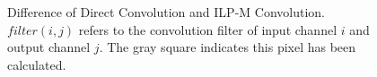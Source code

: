 \documentclass{article}
\begin{document}
\begin{figure}[h!]
\centering
\captionsetup[subfloat]{farskip=2pt,captionskip=1pt}


\hspace{1.2cm}

\caption{Difference of Direct Convolution and ILP-M Convolution. $filter(i, j)$ refers to the convolution filter of input channel $i$ and output channel $j$. The gray square indicates this pixel has been calculated. \label{ccoc}}

\end{figure}






\end{document}
